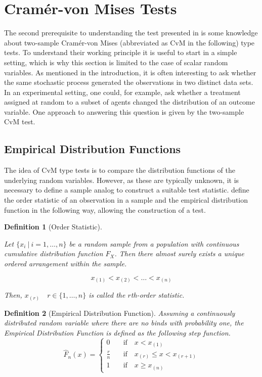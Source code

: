 \documentclass[12pt, a4paper]{article}
\theoremstyle{MAstyle} \newtheorem{assumption}{Assumption}[section]
\theoremstyle{MAstyle} \newtheorem{definition}{Definition}[section]
\theoremstyle{MAstyle} \newtheorem{theorem}{Theorem}[section]
\begin{document}
	\section{Cram\'{e}r-von Mises Tests}\label{CvM_Tests}
		The second prerequisite to understanding the test presented in \cite{bugni_permutation_2021} is some knowledge about two-sample Cram\'er-von Mises (abbreviated as CvM in the following) type tests. To understand their working principle it is useful to start in a simple setting, which is why this section is limited to the case of scalar random variables.
		As mentioned in the introduction, it is often interesting to ask whether the same stochastic process generated the observations in two distinct data sets. In an experimental setting, one could, for example, ask whether a treatment assigned at random to a subset of agents changed the distribution of an outcome variable. 
		One approach to answering this question is given by the two-sample CvM test. 

		\subsection{Empirical Distribution Functions}
			The idea of CvM type tests is to compare the distribution functions of the underlying random variables. However, as these are typically unknown, it is necessary to define a sample analog to construct a suitable test statistic.
			\cite{gibbons_nonparametric_2021} define the order statistic of an observation in a sample and the empirical distribution function in the following way, allowing the construction of a test.
			\begin{definition}[Order Statistic]\label{Order_Stat}
				
				Let $\{x_i \: \vert \: i = 1, \dots , n\}$ be a random sample from a population with continuous cumulative distribution function $F_X$. Then there almost surely exists a unique ordered arrangement within the sample. 
				
				$$x_{(1)} < x_{(2)} < \dots < x_{(n)}$$
				
				Then, $x_{(r)} \quad r \in \{1, \dots, n\}$ is called the $r$th-order statistic.	
			\end{definition}
		
			\begin{definition}[Empirical Distribution Function]
				Assuming a continuously distributed random variable where there are no binds with probability one, the Empirical Distribution Function is defined as the following step function.
				\begin{equation}
					\hat{F}_{n}(x) = \begin{cases}
						0 & \quad \text{if} \quad  x < x_{(1)} \\
						\frac{r}{n} & \quad \text{if} \quad  x_{(r)} \leq x < x_{(r + 1)} \\
						1 & \quad \text{if} \quad  x \geq x_{(n)}
					\end{cases}
				\end{equation}
			\end{definition}
		
\end{document}
